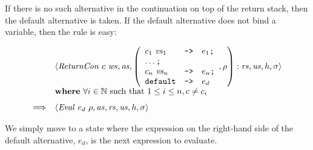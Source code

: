 \documentclass[10pt,a4paper]{exam} %
\begin{document}
If there is no such alternative in the continuation on top of the return stack, then the default alternative is taken. If the default alternative does not bind a variable, then the rule is easy:
\begin{mdframed}
\begin{equation}
\begin{array}{cl}
 & \langle \mathit{ReturnCon}~c~\mathit{ws}, \mathit{as}, \left(\begin{array}{lcl}
 c_1~\mathit{vs}_1 & \texttt{->} & e_1 \texttt{;} \\
 \multicolumn{3}{l}{\ldots \texttt{;}} \\
 c_n~\mathit{vs}_n & \texttt{->} & e_n \texttt{;} \\
 \texttt{default} & \texttt{->} & e_d
 \end{array}, \rho\right) : \mathit{rs}, \mathit{us}, h, \sigma \rangle \\
 & \mathbf{where}~\forall i \in \mathbb{N}~\text{such that}~1 \leq i \leq n, c \neq c_i \\[0.25cm]
\Longrightarrow & \langle \mathit{Eval}~e_d~\rho, \mathit{as}, \mathit{rs}, \mathit{us}, h, \sigma \rangle
\end{array}
\end{equation}
\end{mdframed}
We simply move to a state where the expression on the right-hand side of the default alternative, $e_d$, is the next expression to evaluate.
\end{document}
